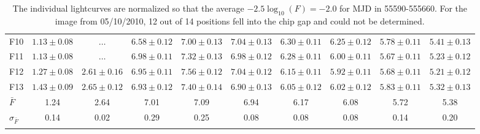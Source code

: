 \begin{table}
\begin{center}
\begin{tabular}{lccccccccc}
F10 & $1.13\pm0.08$ & $\dots$ & $6.58\pm0.12$ & $7.00\pm0.13$ & $7.04\pm0.13$ & $6.30\pm0.11$ & $6.25\pm0.12$ & $5.78\pm0.11$ & $5.41\pm0.13$\\
F11 & $1.13\pm0.08$ & $\dots$ & $6.98\pm0.11$ & $7.32\pm0.13$ & $6.98\pm0.12$ & $6.28\pm0.11$ & $6.00\pm0.11$ & $5.67\pm0.11$ & $5.23\pm0.12$\\
F12 & $1.27\pm0.08$ & $2.61\pm0.16$ & $6.95\pm0.11$ & $7.56\pm0.12$ & $7.04\pm0.12$ & $6.15\pm0.11$ & $5.92\pm0.11$ & $5.68\pm0.11$ & $5.21\pm0.12$\\
F13 & $1.43\pm0.09$ & $2.65\pm0.12$ & $6.93\pm0.12$ & $7.40\pm0.14$ & $6.90\pm0.13$ & $6.05\pm0.12$ & $6.02\pm0.12$ & $5.83\pm0.11$ & $5.32\pm0.13$\\
$\bar{F}$ & 1.24 & 2.64 & 7.01 & 7.09 & 6.94 & 6.17 & 6.08 & 5.72 & 5.38\\
$\sigma_{\bar{F}}$ & 0.14 & 0.02 & 0.29 & 0.25 & 0.08 & 0.08 & 0.08 & 0.14 & 0.20\\
\hline\label{tab:lc}
\end{tabular}
\caption{
The individual lightcurves are normalized so that the average $-2.5
\log_{10}(F) = -2.0$ for MJD in 55590-555660.  For the image from
05/10/2010, 12 out of 14 positions fell into the chip gap and could
not be determined.
}
\end{center}
\end{table}
